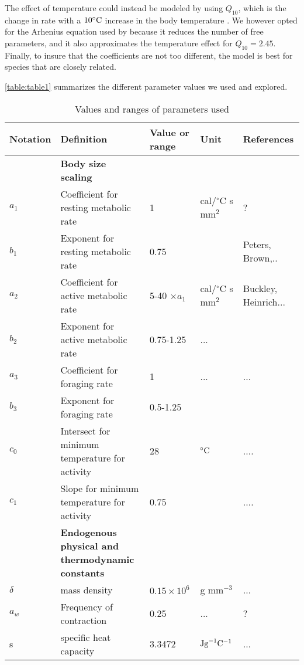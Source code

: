 The effect of temperature could instead be modeled by using $Q_{10}$, which is the change in rate with a $10^ {\circ} \rm{C}$ increase in the body temperature \citep{Precht1973}. %
We however opted for the Arhenius equation used by \citet{Brown2004} because it reduces the number of free parameters, and it also approximates the temperature effect for $Q_{10} = 2.45$.  
Finally, to  insure that the coefficients are not too different, the model is best for species that are closely related. %

\cref{table:table1} summarizes the different parameter values we used and explored.

\begin{sidewaystable}
\caption{Values and ranges of parameters used }
\begin{tabular}{l l l l l}
\hline
Notation& Definition & Value or range & Unit & References \\ 
\hline
&\textbf{ Body size scaling} & & &  \\ 
$a_1$ & Coefficient for resting metabolic rate  & 1 &  cal/$^{\circ}$C s mm$^2$ &  ?\citet{Heinrich1975} \\
$b_1$ & Exponent for resting metabolic rate  & 0.75 &  &  Peters, Brown,.. \\
$a_2$ & Coefficient for active metabolic rate  & 5-40 $ \times a_1$ &  cal/$^{\circ}$C s mm$^2$ &  Buckley, Heinrich... \\
$b_2$ & Exponent for active metabolic rate  & 0.75-1.25 & ... &  \citet{Heinrich1975} \\
$a_3$ & Coefficient for foraging rate  & 1 & ...  &  ... \\
$b_3$ & Exponent  for foraging rate  & 0.5-1.25 &  &  \citet{Nervo2014} \\
$c_0$ & Intersect for minimum temperature for activity & 28 & $^{\circ}\rm{C}$  & ....\\
$c_1$ & Slope for minimum temperature for activity & 0.75 &  & ....\\
\hline
& \textbf{Endogenous physical and thermodynamic constants} & & &  \\
$\delta $ & mass density & $0.15 \times 10^6$  & g  mm$^{-3}$  & ... \\
$a_w$& Frequency of contraction & 0.25 & ...& ?\citet{Bartholomew1977b}\\
s & specific heat capacity & 3.3472 & $\rm{J g}^{-1} \rm{C}^{-1}$ & ... \\

\end{tabular}
\end{sidewaystable}
